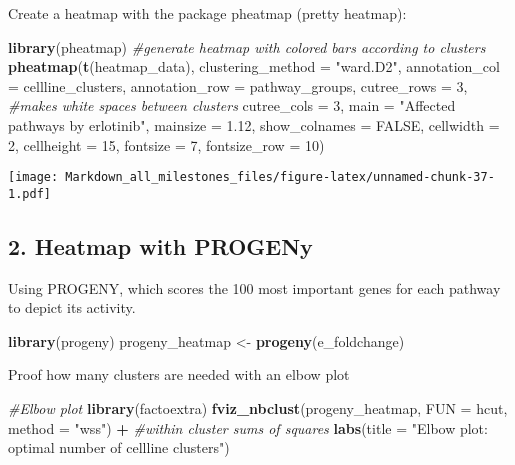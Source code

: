 \documentclass[]{article}
\newenvironment{Shaded}{\begin{snugshade}}{\end{snugshade}}
\newcommand{\CommentTok}[1]{\textcolor[rgb]{0.56,0.35,0.01}{\textit{#1}}}
\newcommand{\DataTypeTok}[1]{\textcolor[rgb]{0.13,0.29,0.53}{#1}}
\newcommand{\DecValTok}[1]{\textcolor[rgb]{0.00,0.00,0.81}{#1}}
\newcommand{\FloatTok}[1]{\textcolor[rgb]{0.00,0.00,0.81}{#1}}
\newcommand{\KeywordTok}[1]{\textcolor[rgb]{0.13,0.29,0.53}{\textbf{#1}}}
\newcommand{\NormalTok}[1]{#1}
\newcommand{\OperatorTok}[1]{\textcolor[rgb]{0.81,0.36,0.00}{\textbf{#1}}}
\newcommand{\OtherTok}[1]{\textcolor[rgb]{0.56,0.35,0.01}{#1}}
\newcommand{\StringTok}[1]{\textcolor[rgb]{0.31,0.60,0.02}{#1}}
\begin{document}
Create a heatmap with the package pheatmap (pretty heatmap):

\begin{Shaded}
\begin{Highlighting}[]
\KeywordTok{library}\NormalTok{(pheatmap)}
\CommentTok{#generate heatmap with colored bars according to clusters}
\KeywordTok{pheatmap}\NormalTok{(}\KeywordTok{t}\NormalTok{(heatmap_data),}
         \DataTypeTok{clustering_method =} \StringTok{"ward.D2"}\NormalTok{,}
         \DataTypeTok{annotation_col =}\NormalTok{ cellline_clusters,}
         \DataTypeTok{annotation_row =}\NormalTok{ pathway_groups,}
         \DataTypeTok{cutree_rows =} \DecValTok{3}\NormalTok{, }\CommentTok{#makes white spaces between clusters}
         \DataTypeTok{cutree_cols =} \DecValTok{3}\NormalTok{,}
         \DataTypeTok{main =} \StringTok{"Affected pathways by erlotinib"}\NormalTok{,}
         \DataTypeTok{mainsize =} \FloatTok{1.12}\NormalTok{,}
         \DataTypeTok{show_colnames =} \OtherTok{FALSE}\NormalTok{,}
         \DataTypeTok{cellwidth =} \DecValTok{2}\NormalTok{,}
         \DataTypeTok{cellheight =} \DecValTok{15}\NormalTok{, }
         \DataTypeTok{fontsize =} \DecValTok{7}\NormalTok{,}
         \DataTypeTok{fontsize_row =} \DecValTok{10}\NormalTok{)}
\end{Highlighting}
\end{Shaded}

\texttt{[image: Markdown\_all\_milestones\_files/figure-latex/unnamed-chunk-37-1.pdf]}

\hypertarget{heatmap-with-progeny}{%
\subsection{2. Heatmap with PROGENy}\label{heatmap-with-progeny}}

Using PROGENY, which scores the 100 most important genes for each
pathway to depict its activity.

\begin{Shaded}
\begin{Highlighting}[]
\KeywordTok{library}\NormalTok{(progeny)}
\NormalTok{progeny_heatmap <-}\StringTok{ }\KeywordTok{progeny}\NormalTok{(e_foldchange)}
\end{Highlighting}
\end{Shaded}

Proof how many clusters are needed with an elbow plot

\begin{Shaded}
\begin{Highlighting}[]
\CommentTok{#Elbow plot}
\KeywordTok{library}\NormalTok{(factoextra)}
\KeywordTok{fviz_nbclust}\NormalTok{(progeny_heatmap, }
             \DataTypeTok{FUN =}\NormalTok{ hcut, }
             \DataTypeTok{method =} \StringTok{"wss"}\NormalTok{) }\OperatorTok{+}\StringTok{ }\CommentTok{#within cluster sums of squares}
\StringTok{  }\KeywordTok{labs}\NormalTok{(}\DataTypeTok{title =} \StringTok{"Elbow plot: optimal number of cellline clusters"}\NormalTok{)}
\end{Highlighting}
\end{Shaded}
\end{document}
